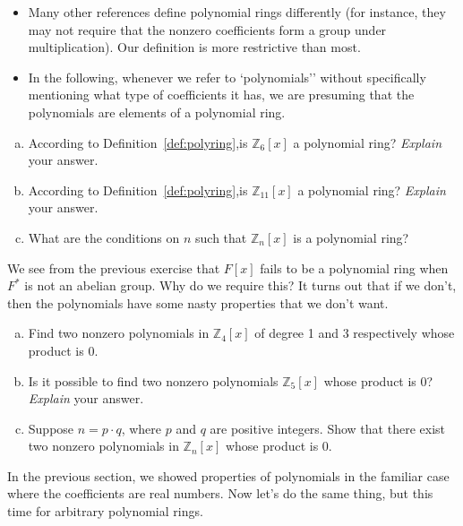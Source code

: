 \begin{rem}
\begin{itemize}
\item
Many other references define polynomial rings differently (for instance, they may not require that the nonzero coefficients form a group under multiplication). Our definition is more restrictive than most.
\item
In the following, whenever we refer to `polynomials'' without specifically mentioning what type of coefficients it has, we are presuming that the polynomials are elements of a polynomial ring.
\end{itemize}
\end{rem}

\begin{exercise}\label{exercise:poly:poly5}
\begin{enumerate}[(a)]
\item
According to Definition~\ref{def:polyring},is $\mathbb{Z}_6[x]$ a polynomial ring? \emph{Explain} your answer.
\item
According to Definition~\ref{def:polyring},is $\mathbb{Z}_{11}[x]$ a polynomial ring? \emph{Explain} your answer.
\item
What are the conditions on $n$ such that $\mathbb{Z}_n[x]$ is a polynomial ring?
\end{enumerate}
\end{exercise}
We see from the previous exercise that $F[x]$ fails to be a polynomial ring when $F^*$ is not an abelian group. Why do we require this? It turns out that if we don't, then the polynomials have some nasty properties that we don't want.

\begin{exercise}\label{exercise:poly:poly6}
\begin{enumerate}[(a)]
\item
Find two nonzero polynomials in $\mathbb{Z}_4[x]$ of degree 1 and 3 respectively  whose product is 0.
\item
Is it possible to find two nonzero polynomials $\mathbb{Z}_5[x]$ whose product is 0? \emph{Explain} your answer.
\item
Suppose $n=p\cdot q$, where $p$ and $q$ are positive integers. Show that there exist two nonzero polynomials in $\mathbb{Z}_n[x]$ whose product is 0.
\end{enumerate}
\end{exercise}
In the previous section, we showed properties of polynomials in the familiar case where the coefficients are real numbers. Now let's 
do the same thing, but this time for arbitrary polynomial rings.
 

